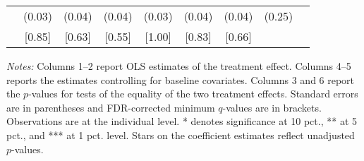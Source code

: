 \begin{table}[h]
{\begin{threeparttable}
\begin{tabular}{l*{8}{c}}
          &   (0.03)&   (0.04)&   (0.04)&   (0.03)&   (0.04)&   (0.04)&   (0.25)&         \\
          &   [0.85]&   [0.63]&   [0.55]&   [1.00]&   [0.83]&   [0.66]&         &         \\
\bottomrule \end{tabular} \begin{tablenotes}[flushleft] \footnotesize \item \emph{Notes:} Columns 1--2 report OLS estimates of the treatment effect. Columns 4--5 reports the estimates controlling for baseline covariates. Columns 3 and 6 report the \(p\)-values for tests of the equality of the two treatment effects. Standard errors are in parentheses and FDR-corrected minimum \(q\)-values are in brackets. Observations are at the individual level. * denotes significance at 10 pct., ** at 5 pct., and *** at 1 pct. level. Stars on the coefficient estimates reflect unadjusted \(p\)-values. \end{tablenotes} \end{threeparttable} } \end{table}

